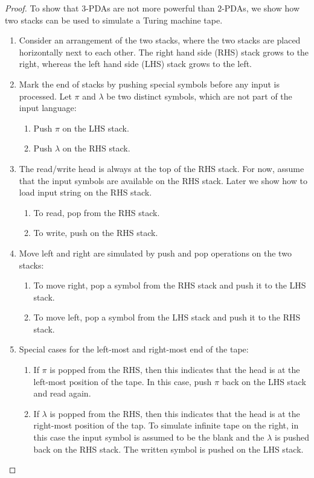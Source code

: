 \documentclass[11pt]{article}
\begin{document}
\begin{proof}
To show that $3$-PDAs are not more powerful than $2$-PDAs, we show how two stacks can be used to simulate a Turing machine tape.
\begin{enumerate}
\item Consider an arrangement of the two stacks, where the two stacks are placed horizontally next to each other. The right hand side (RHS) stack grows to the right, whereas the left hand side (LHS) stack grows to the left.
\item Mark the end of stacks by pushing special symbols before any input is processed. Let $\pi$ and $\lambda$ be two distinct symbols, which are not part of the input language:
\begin{enumerate}
\item Push $\pi$ on the LHS stack.
\item Push $\lambda$ on the RHS stack.
\end{enumerate}
\item The read/write head is always at the top of the RHS stack. For now, assume that the input symbols are available on the RHS stack. Later we show how to load input string on the RHS stack.
\begin{enumerate}
\item To read, pop from the RHS stack.
\item To write, push on the RHS stack.
\end{enumerate}
\item Move left and right are simulated by push and pop operations on the two stacks:
\begin{enumerate}
\item To move right, pop a symbol from the RHS stack and push it to the LHS stack.
\item To move left, pop a symbol from the LHS stack and push it to the RHS stack.
\end{enumerate}
\item Special cases for the left-most and right-most end of the tape:
\begin{enumerate}
\item If $\pi$ is popped from the RHS, then this indicates that the head is at the left-most position of the tape. In this case, push $\pi$ back on the LHS stack and read again.
\item If $\lambda$ is popped from the RHS, then this indicates that the head is at the right-most position of the tap. To simulate infinite tape on the right, in this case the input symbol is assumed to be the blank and the $\lambda$ is pushed back on the RHS stack. The written symbol is pushed on the LHS stack. 
\end{enumerate}
\end{enumerate}


\end{proof}
\end{document}

